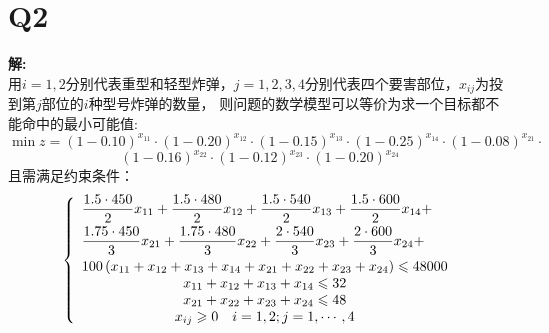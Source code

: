\documentclass{article}
\begin{document}
    \section*{Q2}
    \noindent \textbf{解:} \\
    用\(i=1,2\)分别代表重型和轻型炸弹，\(j=1,2,3,4\)分别代表四个要害部位，\(x_{ij}\)为投到第\(j\)部位的\(i\)种型号炸弹的数量，
    则问题的数学模型可以等价为求一个目标都不能命中的最小可能值:
    \[\min z = {\left( {1 - 0.10} \right)^{{x_{11}}}} \cdot {\left( {1 - 0.20} \right)^{{x_{12}}}} \cdot {\left( {1 - 0.15} \right)^{{x_{13}}}} \cdot {\left( {1 - 0.25} \right)^{{x_{14}}}} \cdot {\left( {1 - 0.08} \right)^{{x_{21}}}} \cdot   \]
    \[{\left( {1 - 0.16} \right)^{{x_{22}}}} \cdot {\left( {1 - 0.12} \right)^{{x_{23}}}} \cdot {\left( {1 - 0.20} \right)^{{x_{24}}}}\]
    且需满足约束条件：
    \[\left\{ {\begin{array}{*{20}{c}}
        \begin{gathered}
        \frac{{1.5 \cdot 450}}{2}{x_{11}} + \frac{{1.5 \cdot 480}}{2}{x_{12}} + \frac{{1.5 \cdot 540}}{2}{x_{13}} + \frac{{1.5 \cdot 600}}{2}{x_{14}} +  \hfill \\
        \frac{{1.75 \cdot 450}}{3}{x_{21}} + \frac{{1.75 \cdot 480}}{3}{x_{22}} + \frac{{2 \cdot 540}}{3}{x_{23}} + \frac{{2 \cdot 600}}{3}{x_{24}} +  \hfill \\
        100\left( {{x_{11}} + {x_{12}} + {x_{13}} + {x_{14}} + {x_{21}} + {x_{22}} + {x_{23}} + {x_{24}}} \right) \leqslant 48000 \hfill \\ 
      \end{gathered}  \\ 
        {{x_{11}} + {x_{12}} + {x_{13}} + {x_{14}} \leqslant 32} \\ 
        {{x_{21}} + {x_{22}} + {x_{23}} + {x_{24}} \leqslant 48} \\ 
        {\begin{array}{*{20}{c}}
        {{x_{ij}} \geqslant 0}&{i = 1,2;j = 1, \cdots ,4} 
      \end{array}} 
      \end{array}} \right.\]
\end{document}
